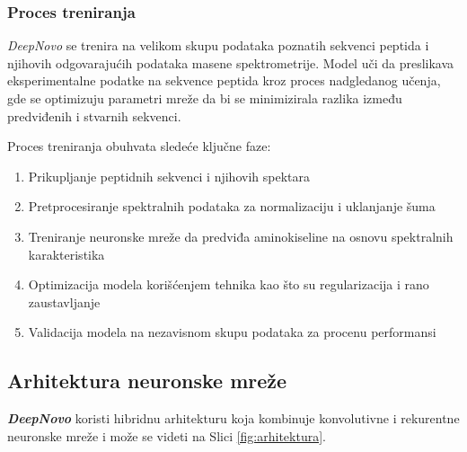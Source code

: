 \documentclass[12pt,oneside]{memoir}
\begin{document}
\subsubsection{Proces treniranja}
\emph{DeepNovo} se trenira na velikom skupu podataka poznatih sekvenci peptida i njihovih odgovarajućih podataka masene spektrometrije. Model uči da preslikava eksperimentalne podatke na sekvence peptida kroz proces nadgledanog učenja, gde se optimizuju parametri mreže da bi se minimizirala razlika između predviđenih i stvarnih sekvenci.

Proces treniranja obuhvata sledeće ključne faze:

\begin{enumerate}
\item Prikupljanje peptidnih sekvenci i njihovih spektara

\item Pretprocesiranje spektralnih podataka za normalizaciju i uklanjanje šuma

\item Treniranje neuronske mreže da predviđa aminokiseline na osnovu spektralnih karakteristika

\item Optimizacija modela korišćenjem tehnika kao što su regularizacija i rano zaustavljanje

\item Validacija modela na nezavisnom skupu podataka za procenu performansi
\end{enumerate}

\subsection{Arhitektura neuronske mreže}
\textbf{\emph{DeepNovo}} koristi hibridnu arhitekturu koja kombinuje konvolutivne i rekurentne neuronske mreže i može se videti na Slici \ref{fig:arhitektura}.
\end{document}
